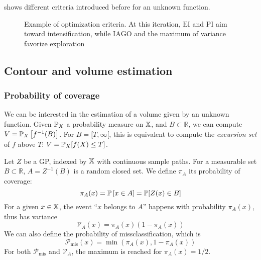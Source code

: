 \documentclass[../../Main_ManuscritThese.tex]{subfiles}
\newcommand\imgpath{/home/victor/acadwriting/Manuscrit/Text/Chapter4/img/}
\begin{document}
 shows different criteria introduced before for an unknown function.
\begin{figure}[ht!]
  \centering
  
  \caption{\label{fig:example_optimization_criteria} Example of optimization criteria. At this iteration, $\mathrm{EI}$ and $\mathrm{PI}$ aim toward intensification, while $\mathrm{IAGO}$ and the maximum of variance favorize exploration}
\end{figure}


 
\subsection{Contour and volume estimation}
\label{sec:GP_vol_estim}

\subsubsection{Probability of coverage}
We can be interested in the estimation of a volume given by an unknown function. Given $\mathbb{P}_{X}$ a probability measure on $\mathbb{X}$, and $B\subset \mathbb{R}$, we can compute $V=\mathbb{P}_{X}\left[f^{-1}(B)\right]$. For $B = [T, \infty[$, this is equivalent to compute the \emph{excursion set} of $f$ above $T$: $V=\mathbb{P}_{X}[f(X) \leq T]$.


Let $Z$ be a GP, indexed by $\mathbb{X}$ with continuous sample paths. For a measurable set $B\subset \mathbb{R}$, $A = Z^{-1}(B)$ is a random closed set.
We define $\pi_A$ its probability of coverage:
\begin{equation}
  \pi_A(x) = \mathbb{P}\left[x\in A\right] = \mathbb{P}[Z(x) \in B]
\end{equation}
For a given $x\in\mathbb{X}$, the event ``$x$ belongs to $A$'' happens with probability $\pi_A(x)$, thus has variance
\begin{equation}
\mathscr{V}_A(x)=\pi_A(x)(1 - \pi_A(x))
\end{equation}
We can also define the probability of missclassification, which is
\begin{equation}
\mathscr{P}_{\mathrm{mis}}(x) = \min(\pi_A(x), 1-\pi_A(x))
\end{equation}
For both $\mathscr{P}_{\mathrm{mis}}$ and $\mathscr{V}_A$, the maximum is reached for $\pi_A(x) = 1/2$.
\end{document}
